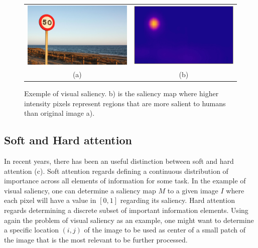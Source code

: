 \documentclass[English]{style/ic-tese-v3}
\begin{document}
\begin{figure}
\begin{center}
		\begin{tabular} {cc}
		\includegraphics[width=0.45\linewidth]{./img/traffic_sign_s.jpg} &
		\includegraphics[width=0.45\linewidth]{./img/traffic_sign_m.jpg}\\
        (a) & (b)
		\end{tabular}
\caption{Exemple of visual saliency.
    b) is the saliency map where higher intensity pixels represent
    regions that are more salient to humans than original image a).}
\label{fig:saliency}
\end{center}
\end{figure}

\subsection{Soft and Hard attention}
In recent years, there has been an useful distinction between
soft and hard attention (c).
Soft attention regards defining a continuous distribution of importance
across all elements of information for some task.
In the example of visual saliency, one can determine a saliency map $M$
to a given image $I$ where each pixel will have a value in $[0, 1]$
regarding its saliency.
Hard attention regards determining a discrete subset of
important information elements.
Using again the problem of visual saliency as an example,
one might want to determine a specific location $(i, j)$ of the image
to be used as center of a small patch of the image that is the most
relevant to be further processed.
\end{document}
